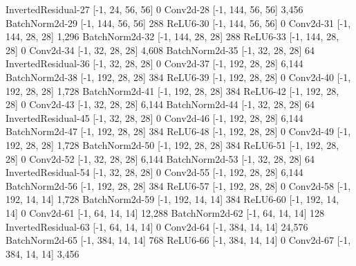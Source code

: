 \documentclass[11pt]{article}
\begin{document}
 InvertedResidual-27           [-1, 24, 56, 56]               0
           Conv2d-28          [-1, 144, 56, 56]           3,456
      BatchNorm2d-29          [-1, 144, 56, 56]             288
            ReLU6-30          [-1, 144, 56, 56]               0
           Conv2d-31          [-1, 144, 28, 28]           1,296
      BatchNorm2d-32          [-1, 144, 28, 28]             288
            ReLU6-33          [-1, 144, 28, 28]               0
           Conv2d-34           [-1, 32, 28, 28]           4,608
      BatchNorm2d-35           [-1, 32, 28, 28]              64
 InvertedResidual-36           [-1, 32, 28, 28]               0
           Conv2d-37          [-1, 192, 28, 28]           6,144
      BatchNorm2d-38          [-1, 192, 28, 28]             384
            ReLU6-39          [-1, 192, 28, 28]               0
           Conv2d-40          [-1, 192, 28, 28]           1,728
      BatchNorm2d-41          [-1, 192, 28, 28]             384
            ReLU6-42          [-1, 192, 28, 28]               0
           Conv2d-43           [-1, 32, 28, 28]           6,144
      BatchNorm2d-44           [-1, 32, 28, 28]              64
 InvertedResidual-45           [-1, 32, 28, 28]               0
           Conv2d-46          [-1, 192, 28, 28]           6,144
      BatchNorm2d-47          [-1, 192, 28, 28]             384
            ReLU6-48          [-1, 192, 28, 28]               0
           Conv2d-49          [-1, 192, 28, 28]           1,728
      BatchNorm2d-50          [-1, 192, 28, 28]             384
            ReLU6-51          [-1, 192, 28, 28]               0
           Conv2d-52           [-1, 32, 28, 28]           6,144
      BatchNorm2d-53           [-1, 32, 28, 28]              64
 InvertedResidual-54           [-1, 32, 28, 28]               0
           Conv2d-55          [-1, 192, 28, 28]           6,144
      BatchNorm2d-56          [-1, 192, 28, 28]             384
            ReLU6-57          [-1, 192, 28, 28]               0
           Conv2d-58          [-1, 192, 14, 14]           1,728
      BatchNorm2d-59          [-1, 192, 14, 14]             384
            ReLU6-60          [-1, 192, 14, 14]               0
           Conv2d-61           [-1, 64, 14, 14]          12,288
      BatchNorm2d-62           [-1, 64, 14, 14]             128
 InvertedResidual-63           [-1, 64, 14, 14]               0
           Conv2d-64          [-1, 384, 14, 14]          24,576
      BatchNorm2d-65          [-1, 384, 14, 14]             768
            ReLU6-66          [-1, 384, 14, 14]               0
           Conv2d-67          [-1, 384, 14, 14]           3,456
\end{document}
